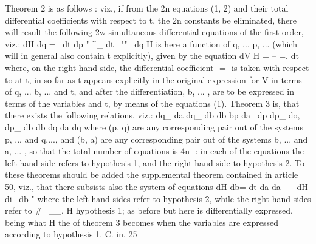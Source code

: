\documentclass[11pt,a4paper]{book}
\begin{document}
Theorem 2 is as follows : viz., if from the 2n equations (1, 2) and their total
differential coefficients with respect to t, the 2n constants be eliminated, there will result
the following 2w simultaneous differential equations of the first order, viz.:
dH
dq =~
dt dp "
^_
dt~ ""
~dq
H
is here a function of q, ... p, ... (which will in general also contain t explicitly),
given by the equation
dV
H = -- =.
dt
where, on the right-hand side, the differential coefficient -=- is taken with respect to
at
t, in so far as t appears explicitly in the original expression for V in terms of
q, ... b, ... and t, and after the differentiation, b, ... , are to be expressed in terms of
the variables and t, by means of the equations (1).
Theorem 3 is, that there exists the following relations, viz.:
dq_ da dq_ db
db bp da~ dp
dp_ do, dp_ db
db dq da dq
where (p, q) are any corresponding pair out of the systems p, ... and q,..., and (b, a)
are any corresponding pair out of the systems b, ... and a, ... , so that the total
number of equations is 4n- : in each of the equations the left-hand side refers to
hypothesis 1, and the right-hand side to hypothesis 2.
To these theorems should be added the supplemental theorem contained in
article 50, viz., that there subsists also the system of equations
dH
db=
dt da
da_
~
dH
di~ db "
where the left-hand sides refer to hypothesis 2, while the right-hand sides refer to
#=__, H
hypothesis 1; as before but here is differentially expressed, being what
H
the of theorem 3 becomes when the variables are expressed according to hypothesis 1.
C. in. 25


\end{document}
